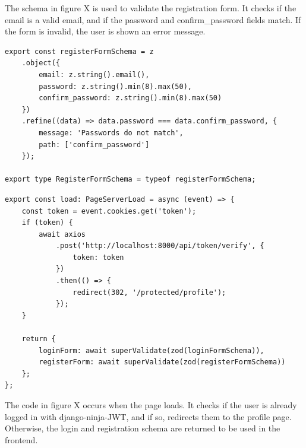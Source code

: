 \vspace{0em}

\begin{minipage}[t]{0.47\textwidth} %
    \vspace{0.5em}
The schema in figure X is used to validate the registration form. It checks if the email is a valid email, and if the password and confirm\_password fields match. If the form is invalid, the user is shown an error message. 
\end{minipage}
\hfill
\begin{minipage}[t]{0.47\textwidth} %
\begin{verbatim}
export const registerFormSchema = z
	.object({
		email: z.string().email(),
		password: z.string().min(8).max(50),
		confirm_password: z.string().min(8).max(50)
	})
	.refine((data) => data.password === data.confirm_password, {
		message: 'Passwords do not match',
		path: ['confirm_password']
	});

export type RegisterFormSchema = typeof registerFormSchema;
\end{verbatim}
\end{minipage}

\vspace{2em}

\begin{minipage}[t]{0.47\textwidth} %
\begin{verbatim}
export const load: PageServerLoad = async (event) => {
	const token = event.cookies.get('token');
	if (token) {
		await axios
			.post('http://localhost:8000/api/token/verify', {
				token: token
			})
			.then(() => {
				redirect(302, '/protected/profile');
			});
	}

	return {
		loginForm: await superValidate(zod(loginFormSchema)),
		registerForm: await superValidate(zod(registerFormSchema))
	};
};
\end{verbatim}
\end{minipage}
\hfill
\begin{minipage}[t]{0.47\textwidth} %
    \vspace{0.5em}
The code in figure X occurs when the page loads. It checks if the user is already logged in with django-ninja-JWT, and if so, redirects them to the profile page. Otherwise, the login and registration schema are returned to be used in the frontend.
\end{minipage}


